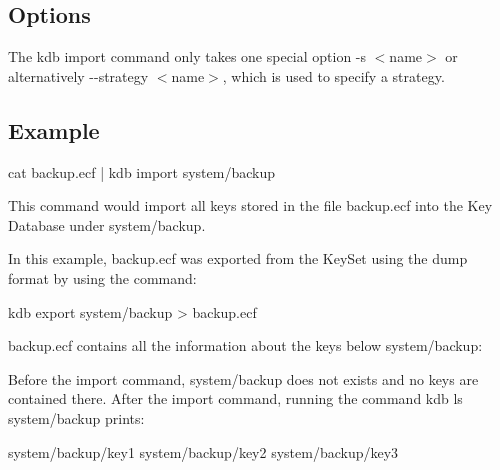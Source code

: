 \subsection*{Options}

The kdb import command only takes one special option {\ttfamily -\/s $<$name$>$} or alternatively {\ttfamily -\/-\/strategy $<$name$>$}, which is used to specify a strategy.

\subsection*{Example}


\begin{DoxyCode}
cat backup.ecf | kdb import system/backup
\end{DoxyCode}


This command would import all keys stored in the file {\ttfamily backup.\+ecf} into the Key Database under {\ttfamily system/backup}.

In this example, {\ttfamily backup.\+ecf} was exported from the Key\+Set using the dump format by using the command\+:


\begin{DoxyCode}
kdb export system/backup > backup.ecf
\end{DoxyCode}


{\ttfamily backup.\+ecf} contains all the information about the keys below {\ttfamily system/backup}\+:




Before the import command, {\ttfamily system/backup} does not exists and no keys are contained there. After the import command, running the command {\ttfamily kdb ls system/backup} prints\+: \begin{DoxyVerb}system/backup/key1
system/backup/key2
system/backup/key3\end{DoxyVerb}
 